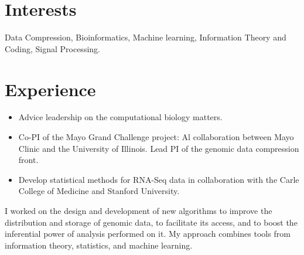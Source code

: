 \documentclass[11pt,a4paper,sans]{moderncv}        %
\begin{document}


\section{Interests}

Data Compression, Bioinformatics, Machine learning, Information Theory and Coding, Signal Processing.


\section{Experience}


\begin{itemize}
\item Advice leadership on the computational biology matters.
\item Co-PI of the Mayo Grand Challenge project: Al collaboration between Mayo Clinic and the University of Illinois. Lead PI of the genomic data compression front.
\item Develop statistical methods for RNA-Seq data in collaboration with the Carle College of Medicine and Stanford University.\\
\end{itemize}


I worked on the design and development of new algorithms to improve the distribution and storage of genomic data, to facilitate its access, and to boost the inferential power of analysis performed on it. My approach combines tools from information theory, statistics, and machine learning.
\end{document}
